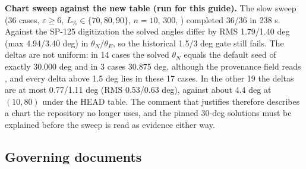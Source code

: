 \textbf{Chart sweep against the new table (run for this guide).} The slow sweep
 (36 cases, $\varepsilon \ge 6$, $L_\% \in \{70, 80, 90\}$,
$n = 10$,  300, ) completed 36/36 in 238 s. Against the SP-125 digitization
the solved angles differ by RMS 1.79/1.40 deg (max 4.94/3.40 deg) in $\theta_N/\theta_E$, so the historical 1.5/3
deg gate still fails. The deltas are not uniform: in 14 cases the solved $\theta_N$ equals the default seed
 of exactly 30.000 deg and in 3 cases 30.875 deg, although the provenance field reads
, and every delta above 1.5 deg lies in these 17 cases. In the other 19 the
deltas are at most 0.77/1.11 deg (RMS 0.53/0.63 deg), against about 4.4 deg at $(10, 80)$ under the HEAD table. The
comment that justifies  therefore describes a chart the repository no
longer uses, and the pinned 30-deg solutions must be explained before the sweep is read as evidence either way.

\subsection{Governing documents}

